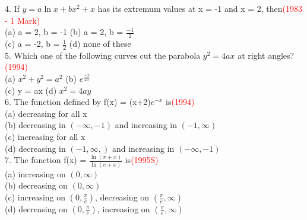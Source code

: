 \documentclass[journal,12pt,twocolumn]{IEEEtran}
\theoremstyle{remark}
\begin{document}
4.  If $y=a\ln x + bx^2 +x$ has its extremum values at \indent x = -1 and x = 2, then\hspace{1.6cm}\textcolor{red}{(1983 - 1 Mark)}\\[2pt]\indent (a)\hspace{0.2cm} a = 2, b = -1\hspace{1cm} (b)\hspace{0.2cm} a = 2, b = $\displaystyle\frac{-1}{2}$\\[2pt]\indent (c)\hspace{0.2cm} a = -2, b = $\displaystyle\frac{1}{2}$\hspace{1cm} (d)\hspace{0.2cm} none of these\\[3pt]
5. Which one of the following curves cut the \indent  parabola $y^2 = 4ax$ at right angles?\hspace{1.2cm}\textcolor{red}{(1994)}\\[2pt]\indent (a)\hspace{0.2cm} $x^2 + y^2 = a^2$\hspace{2cm} (b)\hspace{0.2cm} $e^{\frac{-x}{2a}}$\\[2pt]\indent (c)\hspace{0.2cm} y = ax\hspace{2.9cm} (d)\hspace{0.2cm} $x^2 = 4ay$\\[3pt]6.  The function defined by f(x) = (x+2)$e^{-x}$ is\hspace{0.1cm}\textcolor{red}{(1994)}\\[2pt]\indent (a)\hspace{0.2cm} decreasing for all x\\[2pt]\indent (b)\hspace{0.2cm} decreasing in $(-\infty, -1)$ and increasing in \indent \indent \indent $(-1, \infty)$\\[2pt]\indent (c)\hspace{0.2cm} increasing for all x\\[2pt]\indent (d)\hspace{0.2cm} decreasing in $(-1, \infty,)$ and increasing in \indent \indent \indent $(-\infty, -1)$\\[3pt]
7.  The function f(x) = $\displaystyle\frac{\ln (\pi + x)}{\ln (e + x)}$ is\hspace{1.5cm}\textcolor{red}{(1995S)}\\[2pt]\indent (a)\hspace{0.2cm} increasing on $(0, \infty)$\\[2pt]\indent (b)\hspace{0.2cm} decreasing on $(0, \infty)$\\[2pt]\indent (c)\hspace{0.2cm} increasing on $(0, \displaystyle\frac{\pi}{e})$, decreasing on $(\displaystyle\frac{\pi}{e}, \infty)$\\[2pt]\indent (d)\hspace{0.2cm} decreasing on $(0, \displaystyle\frac{\pi}{e})$, increasing on $(\displaystyle\frac{\pi}{e}, \infty)$\\[3pt]
\end{document}
